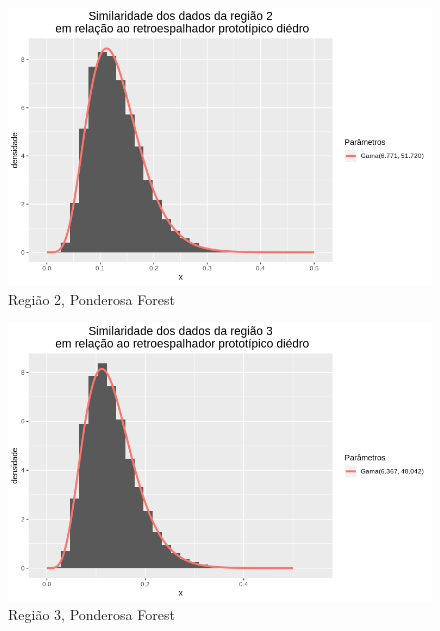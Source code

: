 \documentclass[12pt]{article}
\begin{document}
\begin{figure}[!h]
    \centering
    \vspace{0.08\linewidth}
    \includegraphics[width = \linewidth]{../../Images/Report_18_12_20/ponder_di_region2.png}
    \caption{Região 2, Ponderosa Forest}
    \label{fig:pond_di_r2}
\end{figure}

\begin{figure}[!h]
    \centering
    \vspace{0.1\linewidth}
    \includegraphics[width = \linewidth]{../../Images/Report_18_12_20/ponder_di_region3.png}
    \caption{Região 3, Ponderosa Forest}
    \label{fig:pond_di_r3}
\end{figure}
\end{document}
